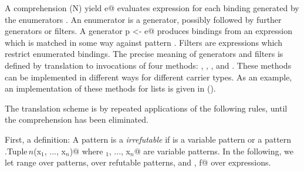 \documentclass[11pt]{report}
\begin{document}
A comprehension \verb@for (N) yield e@ evaluates expression \verb@e@ for each
binding generated by the enumerators \verb@N@. An enumerator is a generator,
possibly followed by further generators or filters.  A generator
\verb@val p <- e@ produces bindings from an expression \verb@e@ which is
matched in some way against pattern \verb@p@. Filters are expressions which
restrict enumerated bindings. The precise meaning of generators and
filters is defined by translation to invocations of four methods:
\verb@map@, \verb@filter@, \verb@flatMap@, and \verb@foreach@. These
methods can be implemented in different ways for different carrier
types.  As an example, an implementation of these methods for lists is
given in ().

The translation scheme is by repeated applications of the following
rules, until the comprehension has been eliminated.

First, a definition: A pattern \verb@p@ is a {\em irrefutable} if \verb@p@ is a
variable pattern or a pattern \verb@scala.Tuple$\,n$(x$_1$, ..., x$_n$)@ where
\verb@x$_1$, ..., x$_n$@ are variable patterns. 
In the following, we let \verb@p@ range over patterns, 
\verb@q@ over refutable patterns, and
\verb@e, f@ over expressions.
\end{document}
